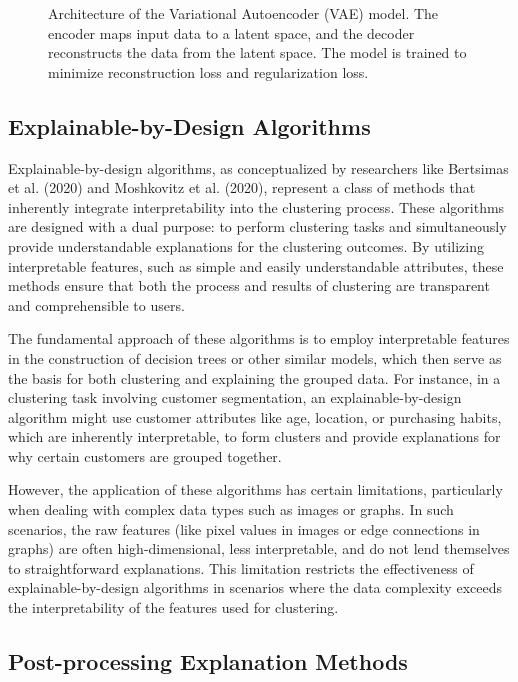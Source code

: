 \begin{figure}[h]
    \centering
    \caption{Architecture of the Variational Autoencoder (VAE) model. The encoder maps input data to a latent space, and the decoder reconstructs the data from the latent space. The model is trained to minimize reconstruction loss and regularization loss.}
    \label{fig:vae_architecture}
\end{figure}

\subsection{Explainable-by-Design Algorithms}

Explainable-by-design algorithms, as conceptualized by researchers like Bertsimas et al. (2020) and Moshkovitz et al. (2020), represent a class of methods that inherently integrate interpretability into the clustering process. These algorithms are designed with a dual purpose: to perform clustering tasks and simultaneously provide understandable explanations for the clustering outcomes. By utilizing interpretable features, such as simple and easily understandable attributes, these methods ensure that both the process and results of clustering are transparent and comprehensible to users.

The fundamental approach of these algorithms is to employ interpretable features in the construction of decision trees or other similar models, which then serve as the basis for both clustering and explaining the grouped data. For instance, in a clustering task involving customer segmentation, an explainable-by-design algorithm might use customer attributes like age, location, or purchasing habits, which are inherently interpretable, to form clusters and provide explanations for why certain customers are grouped together.

However, the application of these algorithms has certain limitations, particularly when dealing with complex data types such as images or graphs. In such scenarios, the raw features (like pixel values in images or edge connections in graphs) are often high-dimensional, less interpretable, and do not lend themselves to straightforward explanations. This limitation restricts the effectiveness of explainable-by-design algorithms in scenarios where the data complexity exceeds the interpretability of the features used for clustering.

\subsection{Post-processing Explanation Methods}

